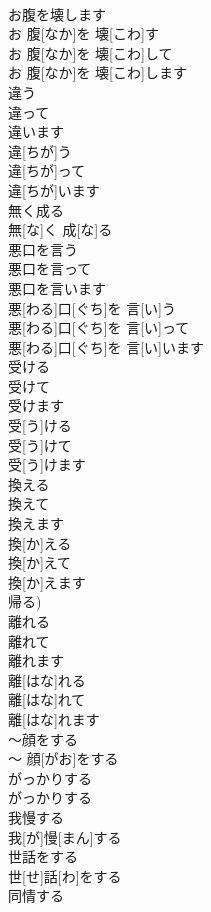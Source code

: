 \documentclass[8pt]{extreport}
\begin{document}
\begin{CJK}{UTF8}{min}
\\	お腹を壊します	
\\	お 腹[なか]を 壊[こわ]す 
\\	お 腹[なか]を 壊[こわ]して 
\\	お 腹[なか]を 壊[こわ]します	
\\	違う 
\\	違って 
\\	違います	
\\	違[ちが]う 
\\	違[ちが]って 
\\	違[ちが]います	
\\	無く成る	
\\	無[な]く 成[な]る	
\\	悪口を言う 
\\	悪口を言って 
\\	悪口を言います	
\\	悪[わる]口[ぐち]を 言[い]う 
\\	悪[わる]口[ぐち]を 言[い]って 
\\	悪[わる]口[ぐち]を 言[い]います	
\\	受ける 
\\	受けて 
\\	受けます	
\\	受[う]ける 
\\	受[う]けて 
\\	受[う]けます	
\\	換える 
\\	換えて 
\\	換えます	
\\	換[か]える 
\\	換[か]えて 
\\	換[か]えます 
\\	帰る)	
\\	離れる 
\\	離れて 
\\	離れます	
\\	離[はな]れる 
\\	離[はな]れて 
\\	離[はな]れます	
\\	〜顔をする	
\\	〜 顔[がお]をする	
\\	がっかりする	
\\	がっかりする	
\\	我慢する	
\\	我[が]慢[まん]する	
\\	世話をする	
\\	世[せ]話[わ]をする	
\\	同情する	

\end{CJK}
\end{document}
